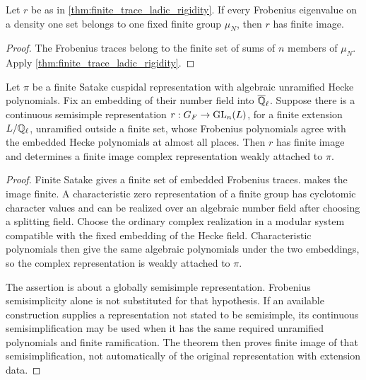 \begin{corollary}\label{thm:cyclotomic_ladic_rigidity}
Let \(r\) be as in \cref{thm:finite_trace_ladic_rigidity}. If every Frobenius eigenvalue on a density one set belongs to one fixed finite group \(\mu_N\), then \(r\) has finite image.
\end{corollary}

\begin{proof}
The Frobenius traces belong to the finite set of sums of \(n\) members of \(\mu_N\). Apply \cref{thm:finite_trace_ladic_rigidity}.
\end{proof}

\begin{theorem}\label{thm:one_ladic_realization}
Let \(\pi\) be a finite Satake cuspidal representation with algebraic unramified Hecke polynomials. Fix an embedding of their number field into \(\overline{\mathbb Q}_\ell\). Suppose there is a continuous semisimple representation \(r:G_F\to\operatorname{GL}_n(L)\), for a finite extension \(L/\mathbb Q_\ell\), unramified outside a finite set, whose Frobenius polynomials agree with the embedded Hecke polynomials at almost all places. Then \(r\) has finite image and determines a finite image complex representation weakly attached to \(\pi\).
\end{theorem}

\begin{proof}
Finite Satake gives a finite set of embedded Frobenius traces.  makes the image finite. A characteristic zero representation of a finite group has cyclotomic character values and can be realized over an algebraic number field after choosing a splitting field. Choose the ordinary complex realization in a modular system compatible with the fixed embedding of the Hecke field. Characteristic polynomials then give the same algebraic polynomials under the two embeddings, so the complex representation is weakly attached to \(\pi\).

The assertion is about a globally semisimple representation. Frobenius semisimplicity alone is not substituted for that hypothesis. If an available construction supplies a representation not stated to be semisimple, its continuous semisimplification may be used when it has the same required unramified polynomials and finite ramification. The theorem then proves finite image of that semisimplification, not automatically of the original representation with extension data.
\end{proof}

